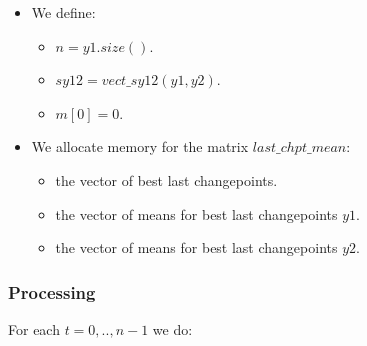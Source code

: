 \documentclass{report}
\begin{document}
\begin{itemize}
	\item We define:
	\begin{itemize}
		\item $n = y1.size()$.
		\item $sy12 = vect\_sy12(y1, y2)$.	
		\item $m[0] = 0$.
	\end{itemize}	
	\item We allocate memory for the matrix $last\_chpt\_mean$:
	\begin{itemize}
		\item the vector of best last changepoints.
		\item the vector of means for best last changepoints $y1$.
		\item the vector of means for best last changepoints $y2$.
	\end{itemize}	
\end{itemize}

\subsubsection*{Processing}

For each $t = 0,..,n-1$ we do:
 
\end{document}
